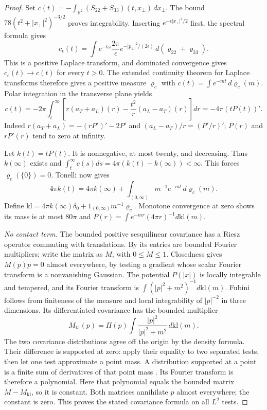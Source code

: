 \documentclass[11pt,letterpaper,reqno]{amsart}
\theoremstyle{definition}
\begin{document}
\begin{proof}
Set $c(t)=-\int_{\mathbb R^2}(S_{22}+S_{33})(t,x_\perp)\,dx_\perp$.
The bound $78(t^2+|x_\perp|^2)^{-3/2}$ proves integrability.
Inserting $e^{-\epsilon|x_\perp|^2/2}$ first, the spectral formula gives
\[
 c_\epsilon(t)=\int e^{-t\omega}
 \frac{2\pi}{\epsilon}e^{-|p_\perp|^2/(2\epsilon)}
                  \,d(\varrho_{22}+\varrho_{33}).
\]
This is a positive Laplace transform, and dominated convergence gives
$c_\epsilon(t)\to c(t)$ for every $t>0$. The extended continuity
theorem for Laplace transforms \cite[Section~XIII.1, Theorem~2a]{Feller1971}
therefore gives a positive measure $\varrho_c$ with
$c(t)=\int e^{-mt}\,d\varrho_c(m)$.
Polar integration in the transverse plane yields
\[
 c(t)=-2\pi\int_t^\infty
       \left[r(a_T+a_L)(r)-\frac{t^2}{r}(a_L-a_T)(r)\right]dr
      =-4\pi(tP(t))'.
\]
Indeed $r(a_T+a_L)=-(rP')'-2P'$ and
$(a_L-a_T)/r=(P'/r)'$; $P(r)$ and $rP'(r)$ tend to zero at infinity.

Let $k(t)=tP(t)$. It is nonnegative, at most twenty, and decreasing.
Thus $k(\infty)$ exists and
$\int_t^\infty c(s)ds=4\pi(k(t)-k(\infty))<\infty$.
This forces $\varrho_c(\{0\})=0$. Tonelli now gives
\[
 4\pi k(t)=4\pi k(\infty)+
             \int_{(0,\infty)}m^{-1}e^{-mt}\,d\varrho_c(m).
\]
Define
$\mathrm{kl}=4\pi k(\infty)\delta_0+
1_{(0,\infty)}m^{-1}\varrho_c$.
Monotone convergence at zero shows its mass is at most $80\pi$ and
$P(r)=\int e^{-mr}(4\pi r)^{-1}d\mathrm{kl}(m)$.

\emph{No contact term.}
The bounded positive sesquilinear covariance has a Riesz operator
commuting with translations. By
\cite[Chapter~I, Theorem~3.18]{SteinWeiss1971} its entries are bounded
Fourier multipliers; write the matrix as $M$, with $0\le M\le1$.
Closedness gives $M(p)p=0$ almost everywhere, by testing a gradient
whose scalar Fourier transform is a nonvanishing Gaussian.
The potential $P(|x|)$ is locally integrable and tempered, and its
Fourier transform is $\int(|p|^2+m^2)^{-1}d\mathrm{kl}(m)$.
Fubini follows from finiteness of the measure and local integrability
of $|p|^{-2}$ in three dimensions. Its differentiated covariance has
the bounded multiplier
\[
 M_{\mathrm{kl}}(p)=\Pi(p)\int\frac{|p|^2}{|p|^2+m^2}
                                             \,d\mathrm{kl}(m).
\]
The two covariance distributions agree off the origin by the density
formula. Their difference is supported at zero: apply their equality
to two separated tests, then let one test approximate a point mass.
A distribution supported at a point is a finite sum of derivatives
of that point mass \cite[Theorems~6.24--6.25]{Rudin1991}.
Its Fourier transform is therefore a polynomial. Here that polynomial
equals the bounded matrix $M-M_{\mathrm{kl}}$, so it is constant.
Both matrices annihilate $p$ almost everywhere; the constant is zero.
This proves the stated covariance formula on all $L^2$ tests.


\end{proof}
\end{document}
